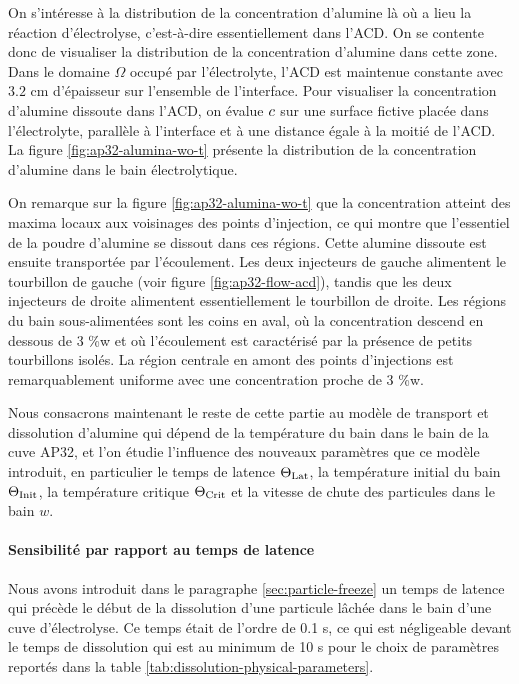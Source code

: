 On s'intéresse à la distribution de la concentration d'alumine là où a
lieu la réaction d'électrolyse, c'est-à-dire essentiellement dans
l'ACD. On se contente donc de visualiser la distribution de la
concentration d'alumine dans cette zone. Dans le domaine $\Omega$
occupé par l'électrolyte, l'ACD est maintenue constante avec $3.2$
\si{\centi\meter} d'épaisseur sur l'ensemble de l'interface. Pour
visualiser la concentration d'alumine dissoute dans l'ACD, on évalue
$c$ sur une surface fictive placée dans l'électrolyte,
parallèle à l'interface et à une distance égale à la moitié de
l'ACD. La figure \ref{fig:ap32-alumina-wo-t} présente la distribution de la
concentration d'alumine dans le bain électrolytique.

On remarque sur la figure \ref{fig:ap32-alumina-wo-t} que la
concentration atteint des maxima locaux aux voisinages des points
d'injection, ce qui montre que l'essentiel de la poudre d'alumine se
dissout dans ces régions. Cette alumine dissoute est ensuite
transportée par l'écoulement. Les deux injecteurs de gauche alimentent
le tourbillon de gauche (voir figure \ref{fig:ap32-flow-acd}), tandis que les deux injecteurs de droite
alimentent essentiellement le tourbillon de droite. Les régions du bain
sous-alimentées sont les coins en aval, où la concentration descend
en dessous de \num{3} \%w et où l'écoulement est
caractérisé par la présence de petits tourbillons isolés. La région
centrale en amont des points d'injections est remarquablement uniforme
avec une concentration proche de \num{3} \%w.


Nous consacrons maintenant le reste de cette partie au
modèle de transport et dissolution d'alumine qui dépend de la
température du bain dans le bain de la cuve AP32, et l'on étudie
l'influence des nouveaux paramètres que ce modèle introduit,
en particulier le temps de latence $\Theta_\text{Lat}$, la température initial du
bain $\Theta_\text{Init}$, la température critique $\Theta_\text{Crit}$ et la vitesse de
chute des particules dans le bain $w$.


\paragraph{Sensibilité par rapport au temps de latence}
Nous avons introduit dans le paragraphe \ref{sec:particle-freeze} un
temps de latence qui précède le début de la dissolution d'une
particule lâchée dans le bain d'une cuve d'électrolyse. Ce temps était de l'ordre de \num{0.1} \si{\second}, ce qui est
négligeable devant le temps de dissolution qui est au minimum de
\num{10} \si{\second} pour le choix de paramètres reportés dans la
table \ref{tab:dissolution-physical-parameters}.


